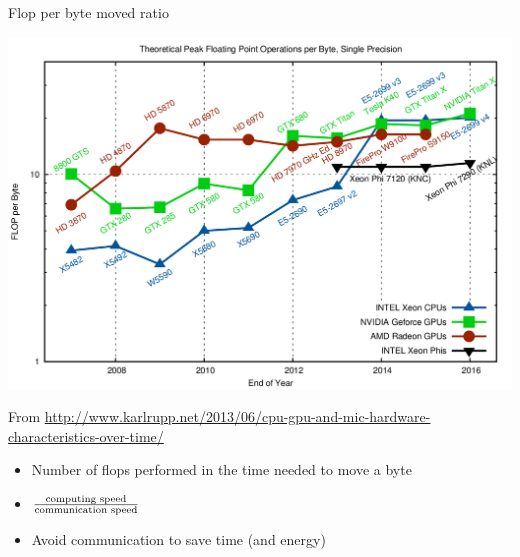 \documentclass[
	12pt, %
]{beamer}
\begin{document}
\begin{frame}{Flop per byte moved ratio}
\centerline{\includegraphics[width=0.625\linewidth]{flop-per-byte-sp.png}}
{\tiny From \url{http://www.karlrupp.net/2013/06/cpu-gpu-and-mic-hardware-characteristics-over-time/}}
\begin{itemize}
	\item Number of flops performed in the time needed to move a byte
	\item $\frac{\textnormal{computing speed}}{\textnormal{communication speed}}$\\
	\item Avoid communication to save time (and energy)
\end{itemize}
\end{frame}
\end{document}
